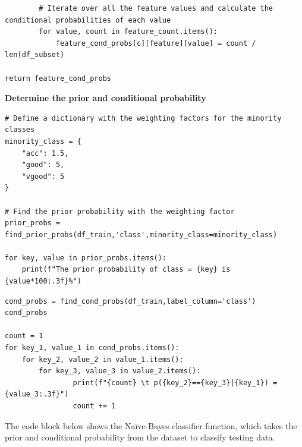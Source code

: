 \documentclass[a4paper]{article}
\begin{document}
\begin{lstlisting}
        # Iterate over all the feature values and calculate the conditional probabilities of each value 
        for value, count in feature_count.items():                  
            feature_cond_probs[c][feature][value] = count / len(df_subset)

return feature_cond_probs
\end{lstlisting}

\textbf{Determine the prior and conditional probability}
\begin{lstlisting}
# Define a dictionary with the weighting factors for the minority classes
minority_class = {
    "acc": 1.5,
    "good": 5,
    "vgood": 5
}

# Find the prior probability with the weighting factor
prior_probs = find_prior_probs(df_train,'class',minority_class=minority_class)

for key, value in prior_probs.items():
    print(f"The prior probability of class = {key} is {value*100:.3f}%")
\end{lstlisting}

\begin{lstlisting}
cond_probs = find_cond_probs(df_train,label_column='class')
cond_probs

count = 1
for key_1, value_1 in cond_probs.items():
    for key_2, value_2 in value_1.items():
        for key_3, value_3 in value_2.items():
                print(f"{count} \t p({key_2}=={key_3}|{key_1}) = {value_3:.3f}")
                count += 1
\end{lstlisting}

The code block below shows the Naïve-Bayes classifier function, which takes the prior and conditional probability from the dataset to classify testing data.
\end{document}
